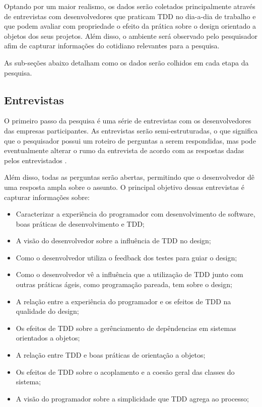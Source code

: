 Optando por um maior realismo, os dados serão coletados principalmente através 
de entrevistas com desenvolvedores que praticam TDD no dia-a-dia de trabalho e
que podem avaliar com propriedade o efeito da prática sobre o design orientado 
a objetos dos seus projetos. Além disso, o ambiente será observado pelo
pesquisador afim de capturar informações do cotidiano relevantes para a pesquisa. 

As sub-seções abaixo detalham como os dados serão colhidos em cada etapa da pesquisa.

\subsection{Entrevistas}
\label{sec:planejamento-estrategia-entrevistas}

O primeiro passo da pesquisa é uma série de entrevistas com os desenvolvedores 
das empresas participantes. As entrevistas serão semi-estruturadas, o que
significa que o pesquisador possui um roteiro de perguntas a serem respondidas, 
mas pode eventualmente alterar o rumo da entrevista de acordo com as respostas 
dadas pelos entrevistados \cite{guidelines-case-study}. 

Além disso, todas as perguntas serão abertas, permitindo que o desenvolvedor dê
uma resposta ampla sobre o assunto. O principal objetivo dessas entrevistas é
capturar informações sobre:

\begin{itemize}
	\item Caracterizar a experiência do programador com desenvolvimento de
	software, boas práticas de desenvolvimento e TDD;

	\item A visão do desenvolvedor sobre a influência de TDD no design;

	\item Como o desenvolvedor utiliza o feedback dos testes para guiar o design;

	\item Como o desenvolvedor vê a influência que a utilização de TDD junto com 
	outras práticas ágeis, como programação pareada, tem sobre o design;

	\item A relação entre a experiência do programador e os efeitos de TDD na 
	qualidade do design;

	\item Os efeitos de TDD sobre a gerênciamento de depêndencias em sistemas 
	orientados a objetos;

	\item A relação entre TDD e boas práticas de orientação a objetos;

	\item Os efeitos de TDD sobre o acoplamento e a coesão geral das classes  do
	sistema;

	\item A visão do programador sobre a simplicidade que TDD agrega ao processo;
\end{itemize} 

